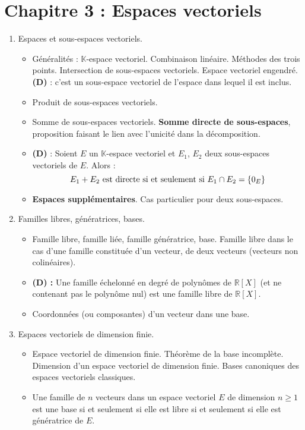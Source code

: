 \documentclass[twoside,a4paper,french,10pt]{VcCours}
\begin{document}
\section*{Chapitre 3 : Espaces vectoriels}
\begin{enumerate}
    \item Espaces et sous-espaces vectoriels.
    \begin{itemize}
    \item Généralités : $\mathbb{K}$-espace vectoriel. Combinaison linéaire. Méthodes des trois points. Intersection de sous-espaces vectoriels. Espace vectoriel engendré. \textbf{(D)} : c'est un sous-espace vectoriel de l'espace dans lequel il est inclus.
    \item Produit de sous-espaces vectoriels.
    \item Somme de sous-espaces vectoriels. \textbf{Somme directe de sous-espaces}, proposition faisant le lien avec l'unicité dans la décomposition.
    \item \textbf{(D)} : Soient $E$ un $\mathbb{K}$-espace vectoriel et $E_1$, $E_2$ deux sous-espaces vectoriels de $E$. Alors :
    $$ E_1 + E_2 \hbox{ est directe si et seulement si } E_1 \cap E_2 = \lbrace 0_E \rbrace $$
    \item \textbf{Espaces supplémentaires}. Cas particulier pour deux sous-espaces.
    \end{itemize}
    \item  Familles libres, génératrices, bases.
    \begin{itemize}
    \item Famille libre, famille liée, famille génératrice, base. Famille libre dans le cas d'une famille constituée d'un vecteur, de deux vecteurs (vecteurs non colinéaires).
    \item \textbf{(D) :} Une famille échelonné en degré de polynômes de $\mathbb{R}[X]$ (et ne contenant pas le polynôme nul) est une famille libre de $\mathbb{R}[X]$.
    \item Coordonnées (ou composantes) d'un vecteur dans une base.
    \end{itemize}
    \item Espaces vectoriels de dimension finie.
    \begin{itemize}
    \item Espace vectoriel de dimension finie. Théorème de la base incomplète. Dimension d'un espace vectoriel de dimension finie. Bases canoniques des espaces vectoriels classiques.
    \item Une famille de $n$ vecteurs dans un espace vectoriel $E$ de dimension $n \geq 1$ est une base si et seulement si elle est libre si et seulement si elle est génératrice de $E$.

\end{itemize}
\end{enumerate}
\end{document}
